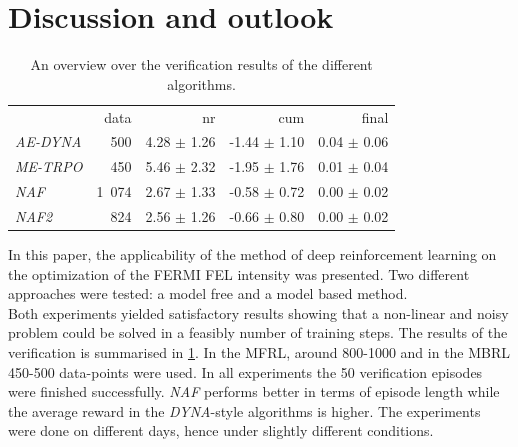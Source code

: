 \documentclass[
reprint,
amsmath,amssymb,amsfonts,clevref,
aps,
prstab,
]{revtex4-2}
\begin{document}
	\section{Discussion and outlook}
	\begin{table}[b]%
		\caption{\label{tab:overview_verification}%
			An overview over the verification results of the different algorithms.
		}
		\begin{ruledtabular}
			\begin{tabular}{lrrrr}
				&  data&  nr&  cum &   final \\
				\emph{AE-DYNA} &500 &  4.28 $\pm$  1.26 & -1.44 $\pm$  1.10 &  0.04 $\pm$  0.06\\
				\emph{ME-TRPO} &450&  5.46 $\pm$  2.32 & -1.95 $\pm$  1.76 &  0.01 $\pm$  0.04\\
				\emph{NAF} &1 074&  2.67 $\pm$  1.33 & -0.58 $\pm$  0.72 &0.00 $\pm$  0.02\\
				\emph{NAF2} &824& 2.56 $\pm$  1.26 & -0.66 $\pm$  0.80 &0.00 $\pm$  0.02\\
			\end{tabular}
		\end{ruledtabular}
	\end{table}
	In this paper, the applicability of the method of deep reinforcement learning on the optimization of the FERMI FEL intensity was presented. Two different approaches were tested: a model free and a model based method.\\
	 Both experiments yielded satisfactory results showing that a non-linear and noisy problem could be solved in a feasibly number of training steps. The results of the verification is summarised in \cref{tab:overview_verification}. In the MFRL, around 800-1000 and in the MBRL 450-500 data-points were used. In all experiments the 50 verification episodes were finished successfully. \emph{NAF} performs better in terms of episode length while the average reward in the \emph{DYNA}-style algorithms is higher. The experiments were done on different days, hence under slightly different conditions.\\
\end{document}
